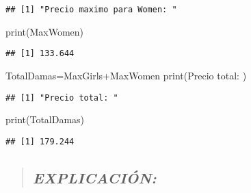 \documentclass[
]{article}
\newenvironment{Shaded}{\begin{snugshade}}{\end{snugshade}}
\newcommand{\FunctionTok}[1]{\textcolor[rgb]{0.00,0.00,0.00}{#1}}
\newcommand{\NormalTok}[1]{#1}
\newcommand{\OtherTok}[1]{\textcolor[rgb]{0.56,0.35,0.01}{#1}}
\newcommand{\SpecialCharTok}[1]{\textcolor[rgb]{0.00,0.00,0.00}{#1}}
\newcommand{\StringTok}[1]{\textcolor[rgb]{0.31,0.60,0.02}{#1}}
\begin{document}
\begin{Shaded}
\end{Shaded}

\begin{verbatim}
## [1] "Precio maximo para Women: "
\end{verbatim}

\begin{Shaded}
\begin{Highlighting}[]
\FunctionTok{print}\NormalTok{(MaxWomen)}
\end{Highlighting}
\end{Shaded}

\begin{verbatim}
## [1] 133.644
\end{verbatim}

\begin{Shaded}
\begin{Highlighting}[]
\NormalTok{TotalDamas}\OtherTok{=}\NormalTok{MaxGirls}\SpecialCharTok{+}\NormalTok{MaxWomen}
\FunctionTok{print}\NormalTok{(}\StringTok{\textquotesingle{}Precio total: \textquotesingle{}}\NormalTok{)}
\end{Highlighting}
\end{Shaded}

\begin{verbatim}
## [1] "Precio total: "
\end{verbatim}

\begin{Shaded}
\begin{Highlighting}[]
\FunctionTok{print}\NormalTok{(TotalDamas)}
\end{Highlighting}
\end{Shaded}

\begin{verbatim}
## [1] 179.244
\end{verbatim}

\begin{quote}
\hypertarget{explicaciuxf3n-9}{%
\subsection{\texorpdfstring{\textbf{\emph{EXPLICACIÓN:}}}{EXPLICACIÓN:}}\label{explicaciuxf3n-9}}
\end{quote}
\end{document}
